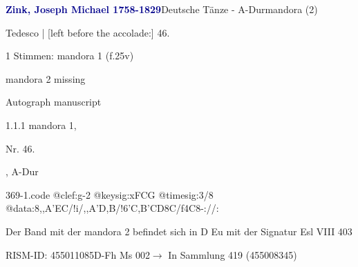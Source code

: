 \documentclass[twocolumn]{book}
\begin{document}
\par \vspace{7pt} \textcolor{darkblue}{\textbf{Zink, Joseph Michael  1758-1829}}\hfillplus{\textbf{[369]}}\newline Deutsche Tänze - A-Dur\newline mandora (2)
\par \begin{itshape}[f.25v, at left:] Tedesco | [left before the accolade:] 46.\end{itshape} 
\par \textcolor{darkblue}{}  1 Stimmen: mandora 1  (f.25v)\newline \begin{small} mandora 2 missing\end{small} \newline Autograph manuscript
\par 1.1.1  mandora 1, \begin{itshape}Nr. 46.\end{itshape}, A-Dur  
\begin{filecontents*}{369-1.code}
@clef:g-2
@keysig:xFCG
@timesig:3/8
@data:8,,A'EC/!i/,,A'D,B/!{6'C,B'CD}8C/f4C8-://:
\end{filecontents*}
\newline
%
\par Der Band mit der mandora 2 befindet sich in D Eu mit der Signatur Esl VIII 403
\par RISM-ID: 455011085\newline D-Fh  Ms 002\newline $\rightarrow$ In Sammlung 419 (455008345)
      
\end{document}
